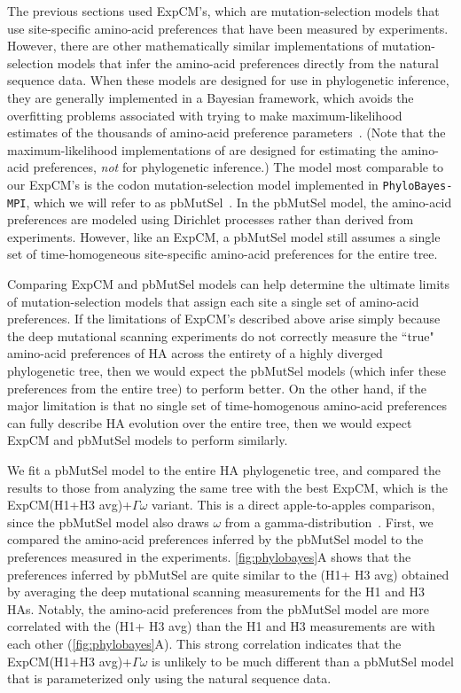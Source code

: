 \documentclass[11pt]{article}
\begin{document}
The previous sections used ExpCM's, which are mutation-selection models that use site-specific amino-acid preferences that have been measured by experiments. 
However, there are other mathematically similar implementations of mutation-selection models that infer the amino-acid preferences directly from the natural sequence data. 
When these models are designed for use in phylogenetic inference, they are generally implemented in a Bayesian framework, which avoids the overfitting problems associated with trying to make maximum-likelihood estimates of the thousands of amino-acid preference parameters~\citep{lartillot2014overcoming}.
(Note that the maximum-likelihood implementations of \citet{tamuri2012estimating,tamuri2014penalized} are designed for estimating the amino-acid preferences, \emph{not} for phylogenetic inference.)
The model most comparable to our ExpCM's is the codon mutation-selection model implemented in \texttt{PhyloBayes-MPI}, which we will refer to as pbMutSel~\citep{rodrigue2014site}. 
In the pbMutSel model, the amino-acid preferences are modeled using Dirichlet processes rather than derived from experiments. 
However, like an ExpCM, a pbMutSel model still assumes a single set of time-homogeneous site-specific amino-acid preferences for the entire tree.

Comparing ExpCM and pbMutSel models can help determine the ultimate limits of mutation-selection models that assign each site a single set of amino-acid preferences. 
If the limitations of ExpCM's described above arise simply because the deep mutational scanning experiments do not correctly measure the ``true" amino-acid preferences of HA across the entirety of a highly diverged phylogenetic tree, then we would expect the pbMutSel models (which infer these preferences from the entire tree) to perform better.
On the other hand, if the major limitation is that no single set of time-homogenous amino-acid preferences can fully describe HA evolution over the entire tree, then we would expect ExpCM and pbMutSel models to perform similarly.

We fit a pbMutSel model to the entire HA phylogenetic tree, and compared the results to those from analyzing the same tree with the best ExpCM, which is the ExpCM(H1+H3 avg)+$\Gamma\omega$ variant.
This is a direct apple-to-apples comparison, since the pbMutSel model also draws $\omega$ from a gamma-distribution~\citep{rodrigue2014site}.
First, we compared the amino-acid preferences inferred by the pbMutSel model to the preferences measured in the experiments.
\ref{fig:phylobayes}A shows that the preferences inferred by pbMutSel are quite similar to the (H1+ H3 avg) obtained by averaging the deep mutational scanning measurements for the H1 and H3 HAs. 
Notably, the amino-acid preferences from the pbMutSel model are more correlated with the (H1+ H3 avg) than the H1 and H3 measurements are with each other (\ref{fig:phylobayes}A).
This strong correlation indicates that the ExpCM(H1+H3 avg)+$\Gamma\omega$ is unlikely to be much different than a pbMutSel model that is parameterized only using the natural sequence data.  
\end{document}

